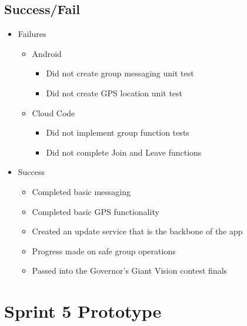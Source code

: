 \subsection{Success/Fail}
\begin{itemize}
	\item Failures
	\begin{itemize}
		\item Android
		\begin{itemize}
			\item Did not create group messaging unit test
			\item Did not create GPS location unit test
		\end{itemize}
		\item Cloud Code
		\begin{itemize}
			\item Did not implement group function tests
			\item Did not complete Join and Leave functions
		\end{itemize}
	\end{itemize}
	\item Success
	\begin{itemize}
		\item Completed basic messaging
		\item Completed basic GPS functionality
		\item Created an update service that is the backbone of the app
		\item Progress made on safe group operations
		\item Passed into the Governor's Giant Vision contest finals
	\end{itemize}
\end{itemize}

\section{Sprint 5 Prototype}
